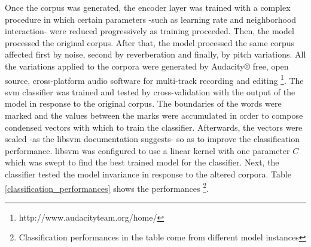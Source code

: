 \documentclass[11pt,a4paper]{article}
\begin{document}
Once the corpus was generated, the encoder layer was trained with a complex procedure
in which certain parameters -such as learning rate and neighborhood interaction- were
reduced progressively as training proceeded. 
Then, the model processed the original corpus.
After that, the model processed the same corpus affected first by noise,
second by reverberation and finally, by pitch variations.
All the variations applied to the corpora were generated by
Audacity® free, open source, cross-platform audio software for
multi-track recording and editing
\footnote{http://www.audacityteam.org/home/}.
The \gls{svm} classifier was trained and tested by cross-validation
with the output of the model in response to the original corpus.
The boundaries of the words were marked and the values between the marks
were accumulated in order to compose condensed vectors with which to train
the classifier.
Afterwards, the vectors were scaled -as the \gls{libsvm} documentation suggests-
so as to improve the classification performance.
\gls{libsvm} was configured to use a linear kernel with one parameter $C$ which
was swept to find the best trained model for the classifier.
Next, the classifier tested the model invariance
in response to the altered corpora.
Table \ref{classification_performances} shows the performances
\footnote{Classification performances in the table come from different model instances}. \\




\end{document}
